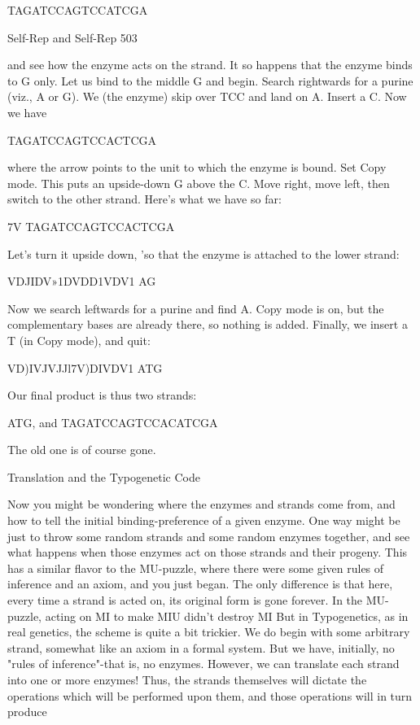 {                                  TAGATCCAGTCCATCGA




Self-Rep and Self-Rep                                                                    503

and see how the enzyme acts on the strand. It so happens that the enzyme binds to G only.
Let us bind to the middle G and begin. Search rightwards for a purine (viz., A or G). We (the
enzyme) skip over TCC and land on A.
Insert a C. Now we have

                                 TAGATCCAGTCCACTCGA

where the arrow points to the unit to which the enzyme is bound. Set Copy mode. This puts
an upside-down G above the C. Move right, move left, then switch to the other strand. Here's
what we have so far:

                                         7V
                                 TAGATCCAGTCCACTCGA

Let's turn it upside down, 'so that the enzyme is attached to the lower strand:

                                  VDJIDV»1DVDD1VDV1
                                          AG

Now we search leftwards for a purine and find A. Copy mode is on, but the complementary
bases are already there, so nothing is added. Finally, we insert a T (in Copy mode), and quit:

                                  VD)IVJVJJl7V)DIVDV1
                                         ATG

Our final product is thus two strands:

        ATG, and TAGATCCAGTCCACATCGA

The old one is of course gone.

                           Translation and the Typogenetic Code

Now you might be wondering where the enzymes and strands come from, and how to tell the
initial binding-preference of a given enzyme. One way might be just to throw some random
strands and some random enzymes together, and see what happens when those enzymes act
on those strands and their progeny. This has a similar flavor to the MU-puzzle, where there
were some given rules of inference and an axiom, and you just began. The only difference is
that here, every time a strand is acted on, its original form is gone forever. In the MU-puzzle,
acting on MI to make MIU didn't destroy MI
         But in Typogenetics, as in real genetics, the scheme is quite a bit trickier. We do
begin with some arbitrary strand, somewhat like an axiom in a formal system. But we have,
initially, no "rules of inference"-that is, no enzymes. However, we can translate each strand
into one or more enzymes! Thus, the strands themselves will dictate the operations which
will be performed upon them, and those operations will in turn produce



}
